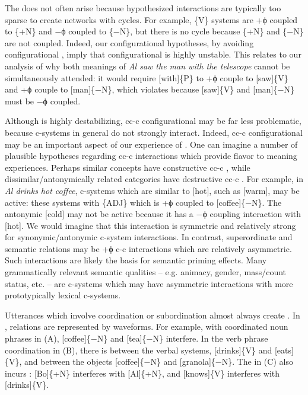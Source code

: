   The  does not often arise because hypothesized  interactions are typically too sparse to create networks with cycles. For example,  \{V\} systems are +ϕ coupled to \{+N\} and −ϕ coupled to \{−N\}, but there is no cycle because \{+N\} and \{−N\} are not coupled. Indeed, our configurational hypotheses, by avoiding configurational , imply that configurational  is highly unstable. This relates to our analysis of why both meanings of \textit{Al saw the man with the telescope} cannot be simultaneously attended: it would require [with]\{P\} to +ϕ couple to [saw]\{V\} and +ϕ couple to [man]\{−N\}, which violates  because [saw]\{V\} and [man]\{−N\} must be −ϕ coupled. 

  Although  is highly destabilizing, cc-c configurational  may be far less problematic, because c-systems in general do not strongly interact. Indeed, cc-c configurational  may be an important aspect of our experience of . One can imagine a number of plausible hypotheses regarding cc-c interactions which provide flavor to meaning experiences. Perhaps similar concepts have constructive cc-c , while dissimilar/antonymically related categories have destructive cc-c . For example, in \textit{Al drinks hot coffee}, c-systems which are similar to [hot], such as [warm], may be active: these systems  with \{\textsc{ADJ}\} which is +ϕ coupled to [coffee]\{−N\}. The antonymic [cold] may not be active because it has a −ϕ coupling interaction with [hot]. We would imagine that this interaction is symmetric and relatively strong for synonymic/antonymic c-system interactions. In contrast, superordinate and  semantic relations may be +ϕ c-c interactions which are relatively asymmetric. Such interactions are likely the basis for semantic priming effects. Many grammatically relevant semantic qualities -- e.g. animacy, gender, mass/count status, etc. -- are c-systems which may have asymmetric interactions with more prototypically lexical c-systems.

  Utterances which involve coordination or subordination almost always create  . In {},  relations are represented by waveforms. For example, with coordinated noun phrases in (A), [coffee]\{−N\} and [tea]\{−N\} interfere. In the verb phrase coordination in (B), there is  between the verbal systems, [drinks]\{V\} and [eats]\{V\}, and between the objects [coffee]\{−N\} and [granola]\{−N\}. The  in (C) also incurs : [Bo]\{+N\} interferes with [Al]\{+N\}, and [knows]\{V\} interferes with [drinks]\{V\}.

